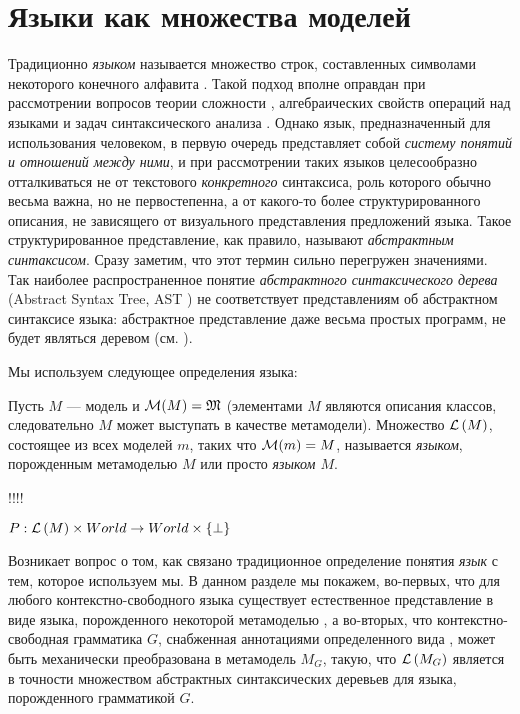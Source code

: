\chapter{Языки как множества моделей}

Традиционно \emph{языком} называется множество строк, составленных символами некоторого конечного алфавита \cite{DragonBook,MotwaniUlman}. Такой подход вполне оправдан при рассмотрении вопросов теории сложности \cite{AroraBarak}, алгебраических свойств операций над языками \cite{Martynenko,MotwaniUlman} и задач синтаксического анализа \cite{DragonBook}. Однако язык, предназначенный для использования человеком, в первую очередь представляет собой \emph{систему понятий и отношений между ними}, и при рассмотрении таких языков целесообразно отталкиваться не от текстового \emph{конкретного} синтаксиса, роль которого обычно весьма важна, но не первостепенна, а от какого-то более структурированного описания, не зависящего от визуального представления предложений языка. Такое структурированное представление, как правило, называют \emph{абстрактным синтаксисом}. Сразу заметим, что этот термин сильно перегружен значениями. Так наиболее распространенное понятие \emph{абстрактного синтаксического дерева} (Abstract Syntax Tree, AST \cite{SGLR,DragonBook}) не соответствует представлениям об абстрактном синтаксисе языка: абстрактное представление даже весьма простых программ, не будет являться деревом (см. ).

Мы используем следующее определения языка:
\begin{Def}[Язык]
Пусть $M$ --- модель и $\mathcal{M}(M) = \mathfrak{M}$ (элементами $M$ являются описания классов, следовательно $M$ может выступать в качестве метамодели). Множество $\mathcal{L}\left(M\right)$, состоящее из всех моделей $m$, таких что 
	$\mathcal{M}(m) = M$,
называется \emph{языком}, порожденным метамоделью $M$ или просто \emph{языком $M$}.
\end{Def}

!!!!

\begin{Def}
$P : \mathcal{L}\left(M\right) \times World \rightarrow World \times \{\bot\}$
\end{Def}

Возникает вопрос о том, как связано традиционное определение понятия \emph{язык} с тем, которое используем мы. В данном разделе мы покажем, во-первых, что для любого контекстно-свободного языка существует естественное представление в виде языка, порожденного некоторой метамоделью \cite{Reuseware-something}, а во-вторых, что контекстно-свободная грамматика $G$, снабженная аннотациями определенного вида \cite{xText}, может быть механически преобразована в метамодель $M_G$, такую, что $\mathcal{L}\left(M_G\right)$ является в точности множеством абстрактных синтаксических деревьев для языка, порожденного грамматикой $G$.

